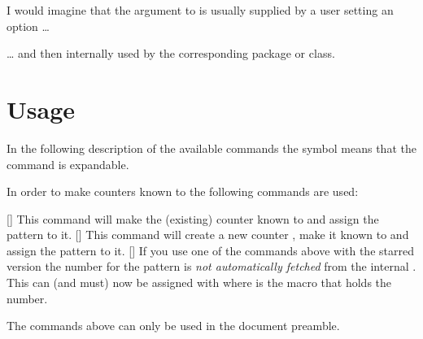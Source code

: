 \documentclass[load-preamble+]{cnltx-doc}
\begin{document}
\begin{example}
\end{example}

I would imagine that the argument to  is usually
supplied by a user setting an option \ldots
\begin{sourcecode}
\end{sourcecode}
\ldots{} and then internally used by the corresponding package or class.


\section{Usage}
In the following description of the available commands the symbol
\textcolor{expandable}{\expandablesign} means that the command is expandable.

In order to make counters known to \cntformats{} the following commands are used:
\begin{commands}
  [\sarg{}]
    This command will make the (existing) counter  known to
    \cntformats{} and assign the pattern  to it.
  [\sarg{}]
    This command will create a new counter , make it known to
    \cntformats{} and assign the pattern  to it.
  []
    If you use one of the commands above with the starred version the number
    for the pattern is \emph{not automatically fetched} from the internal
    .  This can (and must) now be assigned with
      where  is the macro that holds
    the number.
\end{commands}
The commands above can only be used in the document preamble.
\end{document}
